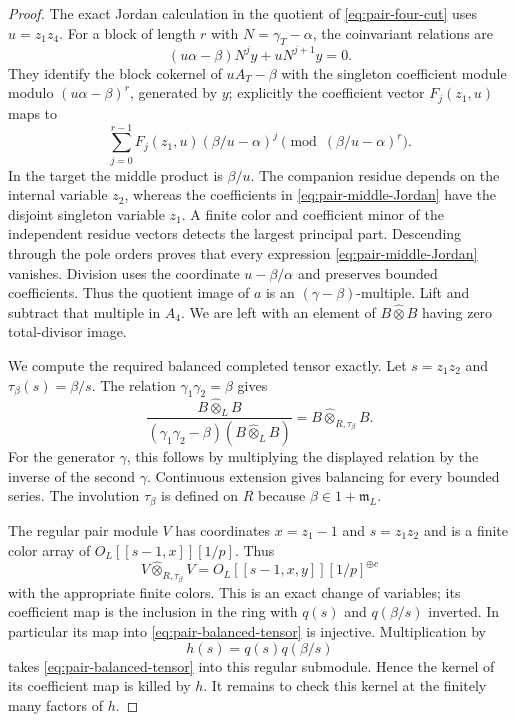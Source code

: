 \begin{proof}
The exact Jordan calculation in the quotient of
\eqref{eq:pair-four-cut} uses $u=z_1z_4$.
For a block of length $r$ with $N=\gamma_T-\alpha$,
the coinvariant relations are
\[
 (u\alpha-\beta)N^jy+uN^{j+1}y=0.
\]
They identify the block cokernel of $uA_T-\beta$
with the singleton coefficient module modulo
$(u\alpha-\beta)^r$, generated by $y$; explicitly
the coefficient vector $F_j(z_1,u)$ maps to
\begin{equation}\label{eq:pair-middle-Jordan}
 \sum_{j=0}^{r-1}F_j(z_1,u)(\beta/u-\alpha)^j
                         \pmod{(\beta/u-\alpha)^r}.
\end{equation}
In the target the middle product is $\beta/u$.
The companion residue depends on the internal
variable $z_2$, whereas the coefficients in
\eqref{eq:pair-middle-Jordan} have the disjoint
singleton variable $z_1$. A finite color and
coefficient minor of the independent residue vectors
detects the largest principal part. Descending through
the pole orders proves that every expression
\eqref{eq:pair-middle-Jordan} vanishes. Division uses
the coordinate $u-\beta/\alpha$ and preserves bounded
coefficients. Thus the quotient image of $a$ is an
$(\gamma-\beta)$-multiple. Lift and subtract
that multiple in $A_4$. We are left with an element
of $B\widehat\otimes B$ having zero total-divisor image.

We compute the required balanced completed tensor
exactly. Let $s=z_1z_2$ and
$\tau_\beta(s)=\beta/s$. The relation
$\gamma_1\gamma_2=\beta$ gives
\begin{equation}\label{eq:pair-balanced-tensor}
 \frac{B\widehat\otimes_L B}
 { (\gamma_1\gamma_2-\beta)(B\widehat\otimes_L B)}
       =B\widehat\otimes_{R,\tau_\beta}B.
\end{equation}
For the generator $\gamma$, this follows by multiplying
the displayed relation by the inverse of the second
$\gamma$. Continuous extension gives balancing for
every bounded series. The involution $\tau_\beta$ is
defined on $R$ because $\beta\in1+\mathfrak m_L$.

The regular pair module $V$ has coordinates
$x=z_1-1$ and $s=z_1z_2$ and is a finite color array of
$O_L[[s-1,x]][1/p]$. Thus
\[
 V\widehat\otimes_{R,\tau_\beta}V
       =O_L[[s-1,x,y]][1/p]^{\oplus c}
\]
with the appropriate finite colors. This is an exact
change of variables; its coefficient map is the
inclusion in the ring with $q(s)$ and $q(\beta/s)$
inverted. In particular its map into
\eqref{eq:pair-balanced-tensor} is injective.
Multiplication by
\[
                           h(s)=q(s)q(\beta/s)
\]
takes \eqref{eq:pair-balanced-tensor} into this regular
submodule. Hence the kernel of its coefficient map
is killed by $h$. It remains to check this kernel
at the finitely many factors of $h$.


\end{proof}
